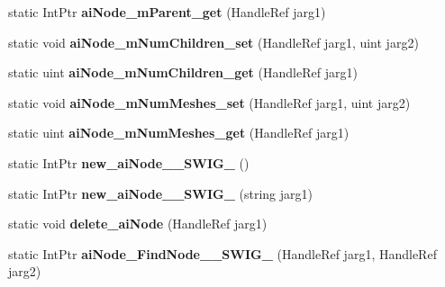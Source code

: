 \begin{DoxyCompactItemize}
\item 
\hypertarget{class_assimp_p_i_n_v_o_k_e_ae1ea7808c64d3fe5c309af413b30249a}{static Int\+Ptr {\bfseries ai\+Node\+\_\+m\+Parent\+\_\+get} (Handle\+Ref jarg1)}\label{class_assimp_p_i_n_v_o_k_e_ae1ea7808c64d3fe5c309af413b30249a}

\item 
\hypertarget{class_assimp_p_i_n_v_o_k_e_a73f061bcf971d0778711d44ccf8b01ab}{static void {\bfseries ai\+Node\+\_\+m\+Num\+Children\+\_\+set} (Handle\+Ref jarg1, uint jarg2)}\label{class_assimp_p_i_n_v_o_k_e_a73f061bcf971d0778711d44ccf8b01ab}

\item 
\hypertarget{class_assimp_p_i_n_v_o_k_e_a8eab34b8cbdf118f8851885d6817233d}{static uint {\bfseries ai\+Node\+\_\+m\+Num\+Children\+\_\+get} (Handle\+Ref jarg1)}\label{class_assimp_p_i_n_v_o_k_e_a8eab34b8cbdf118f8851885d6817233d}

\item 
\hypertarget{class_assimp_p_i_n_v_o_k_e_a53b1c2f8c0c1cebfb1ebf70f3425dcb6}{static void {\bfseries ai\+Node\+\_\+m\+Num\+Meshes\+\_\+set} (Handle\+Ref jarg1, uint jarg2)}\label{class_assimp_p_i_n_v_o_k_e_a53b1c2f8c0c1cebfb1ebf70f3425dcb6}

\item 
\hypertarget{class_assimp_p_i_n_v_o_k_e_aee1b8c5f1abf0c84e53f46be28a60636}{static uint {\bfseries ai\+Node\+\_\+m\+Num\+Meshes\+\_\+get} (Handle\+Ref jarg1)}\label{class_assimp_p_i_n_v_o_k_e_aee1b8c5f1abf0c84e53f46be28a60636}

\item 
\hypertarget{class_assimp_p_i_n_v_o_k_e_a7918c0abbcba955fab464830a9132663}{static Int\+Ptr {\bfseries new\+\_\+ai\+Node\+\_\+\+\_\+\+S\+W\+I\+G\+\_} ()}\label{class_assimp_p_i_n_v_o_k_e_a7918c0abbcba955fab464830a9132663}

\item 
\hypertarget{class_assimp_p_i_n_v_o_k_e_a73169d8b3a8ed25654ac6bf04aff53c9}{static Int\+Ptr {\bfseries new\+\_\+ai\+Node\+\_\+\+\_\+\+S\+W\+I\+G\+\_} (string jarg1)}\label{class_assimp_p_i_n_v_o_k_e_a73169d8b3a8ed25654ac6bf04aff53c9}

\item 
\hypertarget{class_assimp_p_i_n_v_o_k_e_a23d351afd47304fd265eaa11a4aa998b}{static void {\bfseries delete\+\_\+ai\+Node} (Handle\+Ref jarg1)}\label{class_assimp_p_i_n_v_o_k_e_a23d351afd47304fd265eaa11a4aa998b}

\item 
\hypertarget{class_assimp_p_i_n_v_o_k_e_a3efdae90f10be887f3c324635d5aaa3c}{static Int\+Ptr {\bfseries ai\+Node\+\_\+\+Find\+Node\+\_\+\+\_\+\+S\+W\+I\+G\+\_} (Handle\+Ref jarg1, Handle\+Ref jarg2)}\label{class_assimp_p_i_n_v_o_k_e_a3efdae90f10be887f3c324635d5aaa3c}


\end{DoxyCompactItemize}
